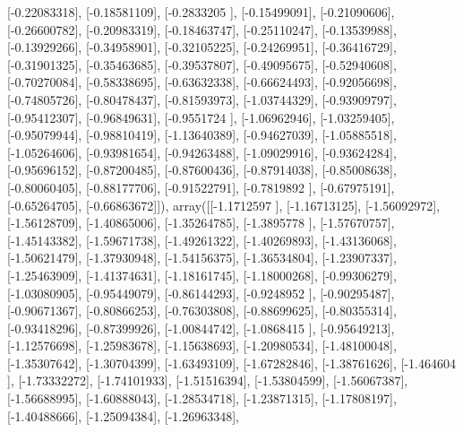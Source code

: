 \documentclass{article}
\begin{document}
       [-0.22083318],
       [-0.18581109],
       [-0.2833205 ],
       [-0.15499091],
       [-0.21090606],
       [-0.26600782],
       [-0.20983319],
       [-0.18463747],
       [-0.25110247],
       [-0.13539988],
       [-0.13929266],
       [-0.34958901],
       [-0.32105225],
       [-0.24269951],
       [-0.36416729],
       [-0.31901325],
       [-0.35463685],
       [-0.39537807],
       [-0.49095675],
       [-0.52940608],
       [-0.70270084],
       [-0.58338695],
       [-0.63632338],
       [-0.66624493],
       [-0.92056698],
       [-0.74805726],
       [-0.80478437],
       [-0.81593973],
       [-1.03744329],
       [-0.93909797],
       [-0.95412307],
       [-0.96849631],
       [-0.9551724 ],
       [-1.06962946],
       [-1.03259405],
       [-0.95079944],
       [-0.98810419],
       [-1.13640389],
       [-0.94627039],
       [-1.05885518],
       [-1.05264606],
       [-0.93981654],
       [-0.94263488],
       [-1.09029916],
       [-0.93624284],
       [-0.95696152],
       [-0.87200485],
       [-0.87600436],
       [-0.87914038],
       [-0.85008638],
       [-0.80060405],
       [-0.88177706],
       [-0.91522791],
       [-0.7819892 ],
       [-0.67975191],
       [-0.65264705],
       [-0.66863672]]), array([[-1.1712597 ],
       [-1.16713125],
       [-1.56092972],
       [-1.56128709],
       [-1.40865006],
       [-1.35264785],
       [-1.3895778 ],
       [-1.57670757],
       [-1.45143382],
       [-1.59671738],
       [-1.49261322],
       [-1.40269893],
       [-1.43136068],
       [-1.50621479],
       [-1.37930948],
       [-1.54156375],
       [-1.36534804],
       [-1.23907337],
       [-1.25463909],
       [-1.41374631],
       [-1.18161745],
       [-1.18000268],
       [-0.99306279],
       [-1.03080905],
       [-0.95449079],
       [-0.86144293],
       [-0.9248952 ],
       [-0.90295487],
       [-0.90671367],
       [-0.80866253],
       [-0.76303808],
       [-0.88699625],
       [-0.80355314],
       [-0.93418296],
       [-0.87399926],
       [-1.00844742],
       [-1.0868415 ],
       [-0.95649213],
       [-1.12576698],
       [-1.25983678],
       [-1.15638693],
       [-1.20980534],
       [-1.48100048],
       [-1.35307642],
       [-1.30704399],
       [-1.63493109],
       [-1.67282846],
       [-1.38761626],
       [-1.464604  ],
       [-1.73332272],
       [-1.74101933],
       [-1.51516394],
       [-1.53804599],
       [-1.56067387],
       [-1.56688995],
       [-1.60888043],
       [-1.28534718],
       [-1.23871315],
       [-1.17808197],
       [-1.40488666],
       [-1.25094384],
       [-1.26963348],
\end{document}
